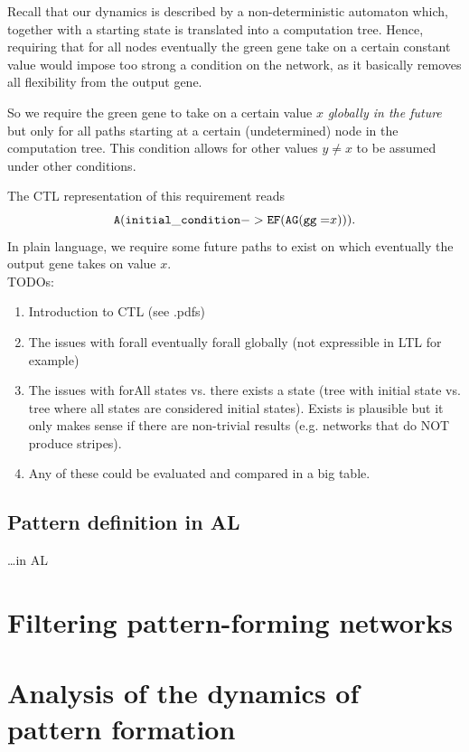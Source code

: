 \documentclass{article}
\begin{document}
\begin{flushleft}
Recall that our dynamics is described by a non-deterministic automaton which,
together with a starting state is translated into a computation tree. Hence,
requiring that for all nodes eventually the green gene take on a certain
constant value would impose too strong a condition on the network, as it
basically removes all flexibility from the output gene.

So we require the green gene to take on a certain value $x$
{\it globally in the future} but only for all paths starting at a certain
(undetermined) node in the computation tree. This condition allows for other
values $y\neq x$ to be assumed under other conditions.

The CTL representation of this requirement reads
\begin{equation}
{\tt A(initial\_condition  -> EF(AG(gg=}x{\tt )))}.
\end{equation}
In plain language, we require some future paths to exist on which
eventually the output gene takes on value $x$. \\

TODOs:
\begin{enumerate}
\item Introduction to CTL (see .pdfs)
\item The issues with forall eventually forall globally (not expressible in LTL for example)
\item The issues with forAll states vs. there exists a state (tree with initial state vs. tree where all states are considered initial states). 
Exists is plausible but it only makes sense if there are non-trivial results (e.g. networks that do NOT produce stripes).
\item Any of these could be evaluated and compared in a big table.
\end{enumerate}

\subsection{Pattern definition in AL}

\ldots in AL

\section{Filtering pattern-forming networks}

\section{Analysis of the dynamics of pattern formation}


\end{flushleft}
\end{document}
